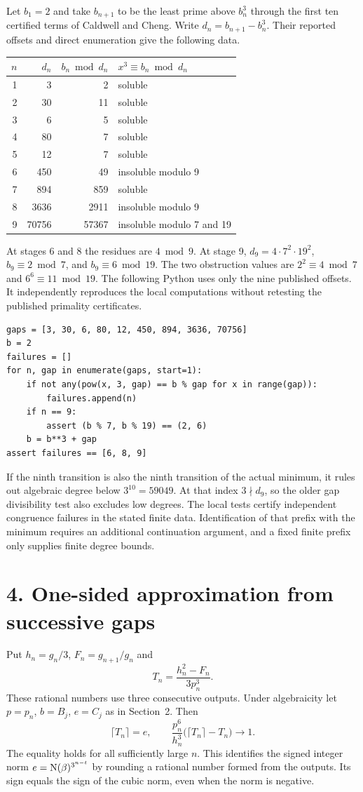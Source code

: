 \documentclass[11pt,a4paper,oneside,openany]{book}
\newcommand{\localhead}[1]{\needspace{5\baselineskip}\section*{\color{ink}#1}}
\let\sect\localhead\let\secx\localhead\let\head\localhead
\begin{document}
Let $b_1=2$ and take $b_{n+1}$ to be the least prime above $b_n^3$ through the first ten certified terms of Caldwell and Cheng. Write $d_n=b_{n+1}-b_n^3$. Their reported offsets and direct enumeration give the following data.
\begin{center}\small
\begin{tabular}{r r r l}
\toprule
$n$ & $d_n$ & $b_n\bmod d_n$ & $x^3\equiv b_n\bmod d_n$\\
\midrule
1 & 3 & 2 & soluble\\
2 & 30 & 11 & soluble\\
3 & 6 & 5 & soluble\\
4 & 80 & 7 & soluble\\
5 & 12 & 7 & soluble\\
6 & 450 & 49 & insoluble modulo 9\\
7 & 894 & 859 & soluble\\
8 & 3636 & 2911 & insoluble modulo 9\\
9 & 70756 & 57367 & insoluble modulo 7 and 19\\
\bottomrule
\end{tabular}
\end{center}
At stages 6 and 8 the residues are $4\bmod9$. At stage 9, $d_9=4\cdot 7^2\cdot19^2$, $b_9\equiv2\bmod7$, and $b_9\equiv6\bmod19$. The two obstruction values are $2^2\equiv4\bmod7$ and $6^6\equiv11\bmod19$. The following Python uses only the nine published offsets. It independently reproduces the local computations without retesting the published primality certificates.
\begin{Verbatim}[fontsize=\footnotesize,breaklines,breakanywhere]
gaps = [3, 30, 6, 80, 12, 450, 894, 3636, 70756]
b = 2
failures = []
for n, gap in enumerate(gaps, start=1):
    if not any(pow(x, 3, gap) == b % gap for x in range(gap)):
        failures.append(n)
    if n == 9:
        assert (b % 7, b % 19) == (2, 6)
    b = b**3 + gap
assert failures == [6, 8, 9]
\end{Verbatim}
If the ninth transition is also the ninth transition of the actual minimum, it rules out algebraic degree below $3^{10}=59049$. At that index $3\nmid d_9$, so the older gap divisibility test also excludes low degrees. The local tests certify independent congruence failures in the stated finite data. Identification of that prefix with the minimum requires an additional continuation argument, and a fixed finite prefix only supplies finite degree bounds.



\sect{4. One-sided approximation from successive gaps}
Put $h_n=g_n/3$, $F_n=g_{n+1}/g_n$ and
\[
 T_n=\frac{h_n^2-F_n}{3p_n^3}.
\]
These rational numbers use three consecutive outputs. Under algebraicity let $p=p_n$, $b=B_j$, $e=C_j$ as in Section~2. Then
\[
 \boxed{\quad \lceil T_n\rceil=e,\qquad
 \frac{p_n^6}{h_n^3}\bigl(\lceil T_n\rceil-T_n\bigr)\longrightarrow1.\quad}
\]
The equality holds for all sufficiently large $n$. This identifies the signed integer norm $e=\operatorname{N}(\beta)^{3^{n-t}}$ by rounding a rational number formed from the outputs. Its sign equals the sign of the cubic norm, even when the norm is negative.
\end{document}
